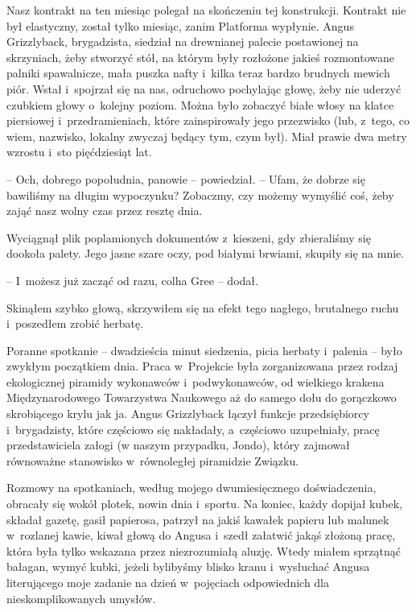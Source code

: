 \documentclass[oneside,polish,11pt,sfheadings]{mwbk}
\begin{document}
Nasz kontrakt na ten miesiąc polegał na skończeniu tej konstrukcji.
Kontrakt nie był elastyczny, został tylko miesiąc, zanim Platforma
wypłynie. Angus Grizzlyback, brygadzista, siedział na drewnianej palecie
postawionej na skrzyniach, żeby stworzyć stół, na którym były rozłożone
jakieś rozmontowane palniki spawalnicze, mała puszka nafty i~kilka teraz
bardzo brudnych mewich piór. Wstał i~spojrzał się na nas, odruchowo
pochylając głowę, żeby nie uderzyć czubkiem głowy o~kolejny poziom.
Można było zobaczyć białe włosy na klatce piersiowej i~przedramieniach,
które zainspirowały jego przezwisko (lub, z~tego, co wiem, nazwisko,
lokalny zwyczaj będący tym, czym był). Miał prawie dwa metry wzrostu i~sto pięćdziesiąt lat.

-- Och, dobrego popołudnia, panowie -- powiedział. -- Ufam, że dobrze się
bawiliśmy na długim wypoczynku? Zobaczmy, czy możemy wymyślić coś, żeby
zająć nasz wolny czas przez resztę dnia.

Wyciągnął plik poplamionych dokumentów z~kieszeni, gdy zbieraliśmy się
dookoła palety. Jego jasne szare oczy, pod białymi brwiami, skupiły się
na mnie.

-- I~możesz już zacząć od razu, colha Gree -- dodał.

Skinąłem szybko głową, skrzywiłem się na efekt tego nagłego, brutalnego
ruchu i~poszedłem zrobić herbatę.

Poranne spotkanie -- dwadzieścia minut siedzenia, picia herbaty i~palenia
-- było zwykłym początkiem dnia. Praca w~Projekcie była zorganizowana
przez rodzaj ekologicznej piramidy wykonawców i~podwykonawców, od
wielkiego krakena Międzynarodowego Towarzystwa Naukowego aż do samego
dołu do gorączkowo skrobiącego krylu jak ja. Angus Grizzlyback łączył
funkcje przedsiębiorcy i~brygadzisty, które częściowo się nakładały, a~częściowo uzupełniały, pracę przedstawiciela załogi (w naszym przypadku,
Jondo), który zajmował równoważne stanowisko w~równoległej piramidzie
Związku.

Rozmowy na spotkaniach, według mojego dwumiesięcznego doświadczenia,
obracały się wokół plotek, nowin dnia i~sportu. Na koniec, każdy dopijał
kubek, składał gazetę, gasił papierosa, patrzył na jakiś kawałek papieru
lub malunek w~rozlanej kawie, kiwał głową do Angusa i~szedł załatwić
jakąś złożoną pracę, która była tylko wskazana przez niezrozumiałą
aluzję. Wtedy miałem sprzątnąć bałagan, wymyć kubki, jeżeli bylibyśmy
blisko kranu i~wysłuchać Angusa literującego moje zadanie na dzień w~pojęciach odpowiednich dla nieskomplikowanych umysłów.
\end{document}
